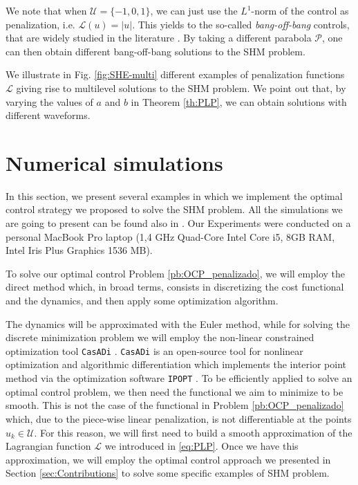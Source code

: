 \documentclass[twocolumn]{autart}    %
\begin{document}
\medskip

\begin{remark}
We note that when  $\mathcal{U}= \{-1,0,1\}$, we can just use the $L^1$-norm of the control as penalization, i.e. $\mathcal{L}(u) = |u|$. This yields to the so-called \emph{bang-off-bang} controls, that are widely studied in the literature \cite{nagahara2013maximum,ikeda2016maximum}. By taking a different parabola $\mathcal{P}$, one can then obtain different bang-off-bang solutions to the SHM problem.
\end{remark}

We illustrate in Fig. \ref{fig:SHE-multi} different examples of penalization functions $\mathcal{L}$ giving rise to multilevel solutions to the SHM problem. We point out that, by varying the values of $a$ and $b$ in Theorem \ref{th:PLP}, we can obtain solutions with different waveforms.

\bigskip

\section{Numerical simulations}\label{sec:Simulations}

In this section, we present several examples in which we implement the optimal control strategy we proposed to solve the SHM problem. All the simulations we are going to present can be found also in \cite{simus}. Our Experiments were conducted on a personal MacBook Pro laptop (1,4 GHz Quad-Core Intel Core i5, 8GB RAM, Intel Iris Plus Graphics 1536 MB). 

To solve our optimal control Problem \ref{pb:OCP_penalizado}, we will employ the direct method \cite{rao2009survey} which, in broad terms, consists in discretizing the cost functional and the dynamics, and then apply some optimization algorithm. 

The dynamics will be approximated with the Euler method, while for solving the discrete minimization problem we will employ the non-linear constrained optimization tool \texttt{CasADi} \cite{Andersson2019}. \texttt{CasADi} is an open-source tool for nonlinear optimization and algorithmic differentiation which implements the interior point method via the optimization software \texttt{IPOPT} \cite{wachter2006implementation}. To be efficiently applied to solve an optimal control problem, we then need the functional we aim to minimize to be smooth. This is not the case of the functional in Problem \ref{pb:OCP_penalizado} which, due to the piece-wise linear penalization, is not differentiable at the points $u_k\in\mathcal U$. For this reason, we will first need to build a smooth approximation of the Lagrangian function $\mathcal L$ we introduced in \eqref{eq:PLP}. Once we have this approximation, we will employ the optimal control approach we presented in Section \ref{sec:Contributions} to solve some specific examples of SHM problem.
\end{document}
